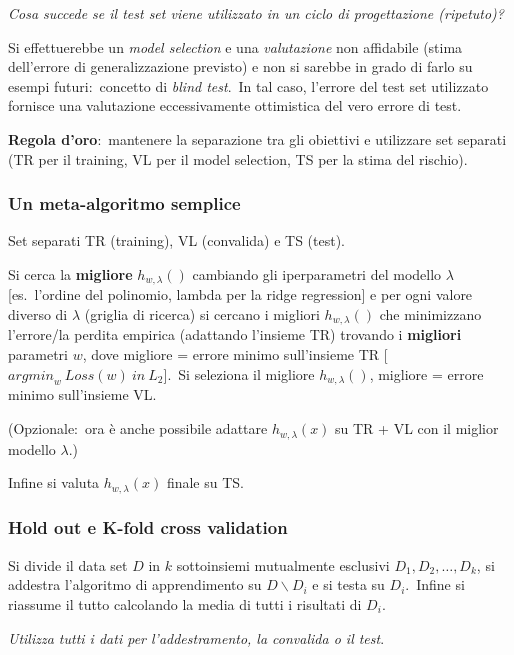 \vspace{12pt}
\noindent\textit{Cosa succede se il test set viene utilizzato in un ciclo di progettazione (ripetuto)?}

\vspace{12pt}

\noindent Si effettuerebbe un \textit{model selection} e una \textit{valutazione} non affidabile (stima dell'errore di generalizzazione previsto) e non si sarebbe in grado di farlo su esempi futuri:\ concetto di \textit{blind test}.\
In tal caso, l'errore del test set utilizzato fornisce una valutazione eccessivamente ottimistica del vero errore di test.\

\textbf{Regola d'oro}:\ mantenere la separazione tra gli obiettivi e utilizzare set separati (TR per il training, VL per il model selection, TS per la stima del rischio).\

\subsubsection{Un meta-algoritmo semplice}

Set separati TR (training), VL (convalida) e TS (test).\

\noindent Si cerca la \textbf{migliore} $h_{w, \lambda}()$ cambiando gli iperparametri del modello $\lambda$ [es.\ l'ordine del polinomio, lambda per la ridge regression] e per ogni valore diverso di $\lambda$ (griglia di ricerca) si cercano i migliori $h_{w, \lambda}()$ che minimizzano l'errore{\slash}la perdita empirica (adattando l'insieme TR) trovando i \textbf{migliori} parametri $w$, dove migliore = errore minimo sull'insieme TR [$\mathit{argmin}_w\ Loss (w)\ in\ L_2$].\
Si seleziona il migliore $h_{w, \lambda}()$, migliore = errore minimo sull'insieme VL.\

\noindent (Opzionale:\ ora è anche possibile adattare $h_{w, \lambda} (x)$ su TR + VL con il miglior modello $\lambda$.)

\noindent Infine si valuta $h_{w, \lambda} (x)$ finale su TS.

\subsubsection{Hold out e K-fold cross validation}

Si divide il data set $D$ in $k$ sottoinsiemi mutualmente esclusivi $D_1, D_2,\dots, D_k$,
si addestra l'algoritmo di apprendimento su $D \backslash D_i$ e si testa su $D_i$.\
Infine si riassume il tutto calcolando la media di tutti i risultati di $D_i$.\
\begin{center}
	\textit{Utilizza tutti i dati per l'addestramento, la convalida o il test}.
\end{center}

